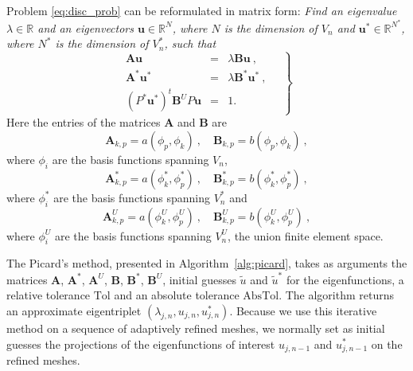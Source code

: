 \documentclass[smallextended]{svjour3}
\begin{document}
Problem \eqref{eq:disc_prob} can be reformulated in matrix form:
\emph{Find an eigenvalue $\lambda\in \mathbb{R}$ and an eigenvectors 
$\mathbf{u}\in \mathbb{R}^N$, where $N$ is the dimension of $V_n$ and $\mathbf{u}^*\in \mathbb{R}^{N^*}$, where $N^*$ is the dimension of $V_n^*$,
such that}
\begin{equation}
\label{eq:disc_prob_mat}
\left.
\begin{array}{lcl}
\mathbf{A} \mathbf{u}&=& \lambda\mathbf{B}\mathbf{u}\ ,
\\
\mathbf{A}^* \mathbf{u}^*&=& \lambda\mathbf{B}^*\mathbf{u}^*\ ,
\\
(P^*\mathbf{u}^*)^t\mathbf{B}^U P\mathbf{u} &=& 1.
\end{array}\quad
\right\}
\end{equation}
Here the entries of the matrices $\mathbf{A}$ and $\mathbf{B}$ are 
$$
\mathbf{A}_{k,p}=a(\phi_p,\phi_k)\ ,\quad\mathbf{B}_{k,p}=b(\phi_p,\phi_k)\ ,
$$
where $\phi_i$ are the basis functions spanning $V_n$,
$$
\mathbf{A}^*_{k,p}=a(\phi_k^*,\phi_p^*)\ ,\quad\mathbf{B}^*_{k,p}=b(\phi_k^*,\phi_p^*)\ ,
$$
where $\phi_i^*$ are the basis functions spanning $V_n^*$ and
$$
\mathbf{A}^U_{k,p}=a(\phi_k^U,\phi_p^U)\ ,\quad\mathbf{B}^U_{k,p}=b(\phi_k^U,\phi_p^U)\ ,
$$
where $\phi_i^U$ are the basis functions spanning $V_n^U$, the union finite element space.



The Picard's method, presented in Algorithm~\ref{alg:picard}, takes as arguments the matrices $\mathbf{A}$, $\mathbf{A}^*$, $\mathbf{A}^U$, $\mathbf{B}$, $\mathbf{B}^*$, $\mathbf{B}^U$, initial guesses $\tilde u$ and $\tilde u^*$ for the eigenfunctions, a relative tolerance $\mathrm{Tol}$ and an absolute tolerance $\mathrm{AbsTol}$. 
The algorithm returns an approximate eigentriplet $(\lambda_{j,n},u_{j,n},u_{j,n}^*)$.
Because we use this iterative method on a sequence of adaptively refined meshes, we normally set as initial guesses
the projections of the eigenfunctions of interest $u_{j,n-1}$ and $u_{j,n-1}^*$ on the refined meshes.
\end{document}
